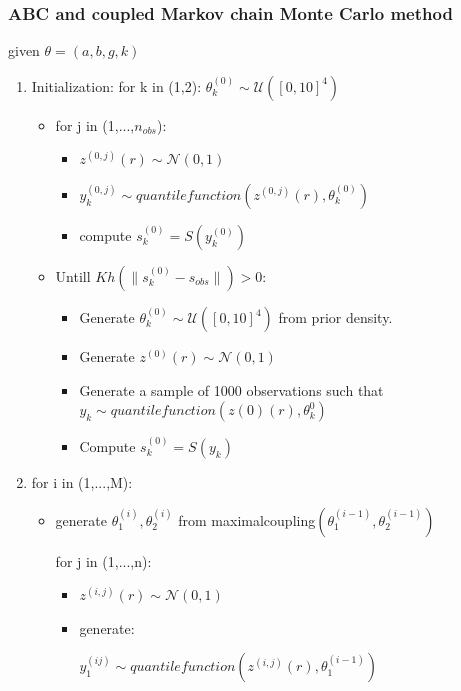\documentclass {article}
\begin{document}
\subsubsection{ABC and coupled Markov chain Monte Carlo method}
given $\theta =( a,b,g,k )$
\begin{enumerate}

\item Initialization:
for k in (1,2):
$ \theta_{k}^{(0)} \sim \mathcal{U}([0,10]^4)$ 

\begin{itemize}
\item for j in (1,...,$n_{obs}$):
\begin{itemize}
	\item $z^{(0,j)}(r) \sim \mathcal{N}(0,1)  $
	
	\item $ y_{k}^{(0,j)} \sim quantilefunction(z^{(0,j)}(r),\theta_{k}^{(0)})$
	
	\item compute $ s_{k}^{(0)} =S(y_{k}^{(0)})$
\end{itemize}

\item Untill $Kh(\|s_{k}^{(0)} - s_{obs}\|)>0$:
\begin{itemize}
	\item Generate $\theta_{k}^{(0)} \sim \mathcal{U}([0,10]^4)$ from prior density.
	\item Generate $z^{(0)}(r) \sim \mathcal{N}(0,1)$
	\item Generate a sample of 1000 observations such that $y_{k} \sim quantile function(z{(0)}(r),\theta_{k}^{0})$
	\item Compute $s_{k}^{(0)}=S(y_{k})$
	
\end{itemize}
\end{itemize}


\item for i in (1,...,M):
\begin{itemize}
	\item 	generate $\theta_{1}^{(i)},\theta_{2}^{(i)}$  from maximalcoupling$(\theta_{1}^{(i-1)},\theta_{2}^{(i-1)})$
	
		
	for j in (1,...,n):
	\begin{itemize}
		\item $z^{(i,j)}(r) \sim \mathcal{N}(0,1)$
		\item generate:
		
		$ y_{1}^{(ij)} \sim quantile function(z^{(i,j)}(r), \theta_{1}^{(i-1)})$
		

\end{itemize}
\end{itemize}
\end{enumerate}
\end{document}
